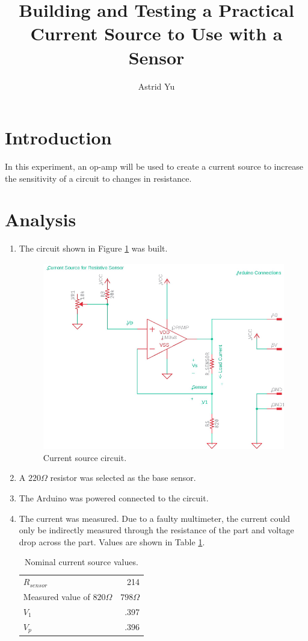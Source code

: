 \documentclass[12pt]{article}
\author{Astrid Yu}
\title{Building and Testing a Practical Current Source to Use with a Sensor}
\begin{document}
\maketitle

\section*{Introduction}

In this experiment, an op-amp will be used to create a current source to increase the sensitivity of a circuit to changes in resistance. 

\section*{Analysis}

\begin{enumerate}
    \item The circuit shown in Figure \ref{fig:is} was built. 
    
    \begin{figure}
        \centering
        \includegraphics[width=0.8\linewidth]{is.png}
        \caption{Current source circuit.}
        \label{fig:is}
    \end{figure}
    \item A $220\Omega$ resistor was selected as the base sensor.
    \item The Arduino was powered connected to the circuit.
    \item The current was measured. Due to a faulty multimeter, the current could only be indirectly measured through the resistance of the part and voltage drop across the part. Values are shown in Table \ref{tbl:nominal}.
\begin{table}[ht]
    \centering
    \caption{Nominal current source values.}
    \begin{tabular}{| l | r |}
        \hline
        $R_{sensor}$ & 214 \\
        Measured value of $820\Omega$ & $798\Omega$ \\
        $V_1$ & .397 \\
        $V_p$ & .396 \\
        \hline
    \end{tabular}
    \label{tbl:nominal}
\end{table}


\end{enumerate}
\end{document}
